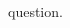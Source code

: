 \documentclass[11pt]{article}
\begin{document}
\begin{multicols}{2}


question.


\end{multicols}
\end{document}
